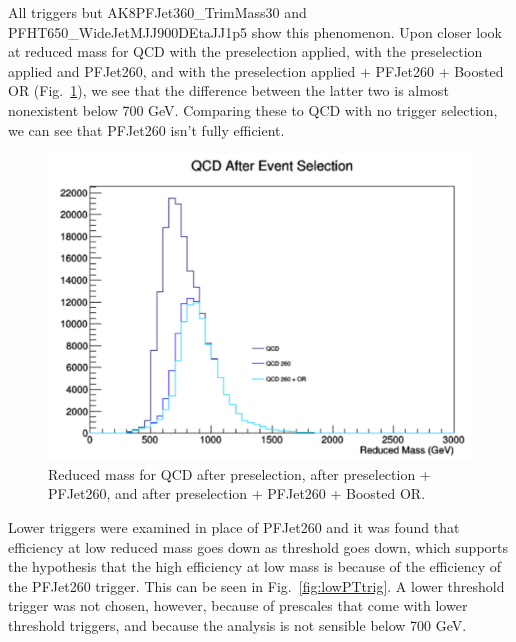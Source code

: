 All triggers but AK8PFJet360\_TrimMass30 and PFHT650\_WideJetMJJ900DEtaJJ1p5 show this phenomenon. Upon closer look at reduced mass for QCD with the preselection applied, with the preselection applied and PFJet260, and with the preselection applied + PFJet260 + Boosted OR (Fig.~\ref{fig:QCDredm}), we see that the difference between the latter two is almost nonexistent below 700 GeV. Comparing these to QCD with no trigger selection, we can see that PFJet260 isn't fully efficient. 

\begin{figure}[thb!]
\begin{center}
\includegraphics[scale=0.35]{Figures/QCDRedm.pdf}
\end{center}
\caption{Reduced mass for QCD after preselection, after preselection + PFJet260, and after preselection + PFJet260 + Boosted OR.}
\label{fig:QCDredm}
\end{figure}

Lower \pt triggers were examined in place of PFJet260 and it was found that efficiency at low reduced mass goes down as \pt threshold goes down, which supports the hypothesis that the high efficiency at low mass is because of the efficiency of the PFJet260 trigger. This can be seen in Fig.~\ref{fig:lowPTtrig}. A lower threshold trigger was not chosen, however, because of prescales that come with lower threshold triggers, and because the analysis is not sensible below 700 GeV.

